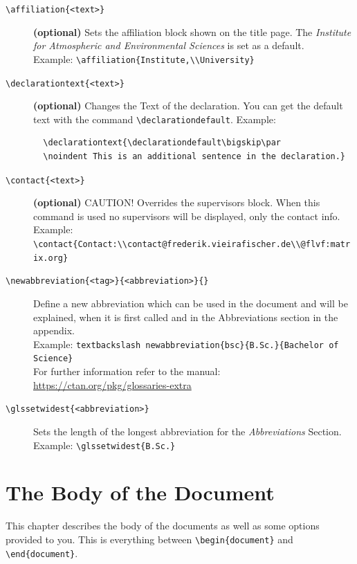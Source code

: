 \documentclass[12pt, todonotes, nodeclaration, oneside, fancypagenumbers, notof, notot, noabstract]{IAUthesis}
\newcommand{\code}[1]{\colorbox{black!10!white}{\texttt{#1}}}
\begin{document}
\begin{description}
\item[\code{\textbackslash affiliation\{<text>\}}]{\textbf{(optional)}} Sets the affiliation block shown on the title page. The \emph{Institute for Atmospheric and Environmental Sciences} is set as a default.\\Example: \texttt{\textbackslash affiliation\{Institute,\textbackslash\textbackslash University\}} 
\item[\code{\textbackslash declarationtext\{<text>\}}]{\textbf{(optional)}} Changes the Text of the declaration. You can get the default text with the command \texttt{\textbackslash declarationdefault}. Example: \begin{verbatim}
  \declarationtext{\declarationdefault\bigskip\par
  \noindent This is an additional sentence in the declaration.}
\end{verbatim}
\item[\code{\textbackslash contact\{<text>\}}]{\textbf{(optional)}} CAUTION! Overrides the supervisors block. When this command is used no supervisors will be displayed, only the contact info. Example:\\ \texttt{\textbackslash contact\{Contact:\textbackslash\textbackslash contact@frederik.vieirafischer.de\textbackslash\textbackslash @flvf:matrix.org\}}
\item[\code{\textbackslash newabbreviation\{<tag>\}\{<abbreviation>\}\{<full-text>\}}] Define a new abbreviation which can be used in the document and will be explained, when it is first called and in the Abbreviations section in the appendix.\\Example: \texttt{textbackslash newabbreviation\{bsc\}\{B.Sc.\}\{Bachelor of Science\}}\\For further information refer to the manual:\\ \url{https://ctan.org/pkg/glossaries-extra}
\item[\code{\textbackslash glssetwidest\{<abbreviation>\}}] Sets the length of the longest abbreviation for the \emph{Abbreviations} Section. Example: \texttt{\textbackslash glssetwidest\{B.Sc.\}}
\end{description}

\chapter{The Body of the Document}
This chapter describes the body of the documents as well as some options provided to you. This is everything between \code{\textbackslash begin\{document\}} and \code{\textbackslash end\{document\}}.
\end{document}
